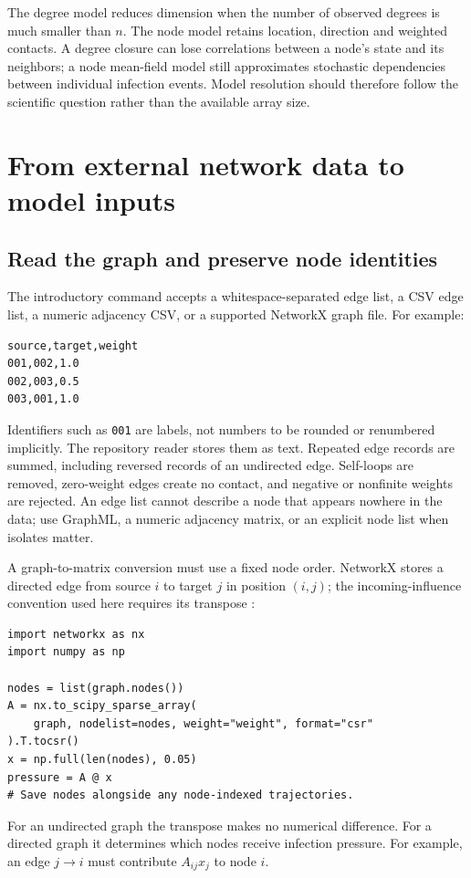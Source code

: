 \documentclass[11pt,a4paper]{article}
\theoremstyle{definition}
\theoremstyle{remark}
\begin{document}
The degree model reduces dimension when the number of observed degrees is much smaller than $n$. The node model retains location, direction and weighted contacts. A degree closure can lose correlations between a node's state and its neighbors; a node mean-field model still approximates stochastic dependencies between individual infection events. Model resolution should therefore follow the scientific question rather than the available array size.

\section{From external network data to model inputs}
\subsection{Read the graph and preserve node identities}
The introductory command accepts a whitespace-separated edge list, a CSV edge list, a numeric adjacency CSV, or a supported NetworkX graph file. For example:
\begin{lstlisting}[language={},caption={CSV edge-list structure}]
source,target,weight
001,002,1.0
002,003,0.5
003,001,1.0
\end{lstlisting}
Identifiers such as \texttt{001} are labels, not numbers to be rounded or renumbered implicitly. The repository reader stores them as text. Repeated edge records are summed, including reversed records of an undirected edge. Self-loops are removed, zero-weight edges create no contact, and negative or nonfinite weights are rejected. An edge list cannot describe a node that appears nowhere in the data; use GraphML, a numeric adjacency matrix, or an explicit node list when isolates matter.

A graph-to-matrix conversion must use a fixed node order. NetworkX stores a directed edge from source $i$ to target $j$ in position $(i,j)$; the incoming-influence convention used here requires its transpose \cite{networkx}:
\begin{lstlisting}[caption={Construct an incoming-influence matrix}]
import networkx as nx
import numpy as np

nodes = list(graph.nodes())
A = nx.to_scipy_sparse_array(
    graph, nodelist=nodes, weight="weight", format="csr"
).T.tocsr()
x = np.full(len(nodes), 0.05)
pressure = A @ x
# Save nodes alongside any node-indexed trajectories.
\end{lstlisting}
For an undirected graph the transpose makes no numerical difference. For a directed graph it determines which nodes receive infection pressure. For example, an edge $j\to i$ must contribute $A_{ij}x_j$ to node $i$.
\end{document}
